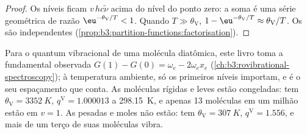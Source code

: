 \begin{proof}
Os níveis ficam $v\,hc\tilde\nu$ acima do nível do ponto zero: a soma é uma série geométrica
de razão $\eu^{-\theta_{\mathrm V}/T} < 1$. Quando $T \gg \theta_{\mathrm V}$, $1 - \eu^{-\theta_{\mathrm V}/T} \approx \theta_{\mathrm V}/T$.
Os  são independentes (\cref{prop:b3:partition-functions:factorisation}).
\end{proof}

Para o quantum vibracional de uma molécula diatômica, este livro toma a
fundamental observada $G(1) - G(0) = \omega_e - 2\omega_ex_e$
(\cref{ch:b3:rovibrational-spectroscopy}); à temperatura ambiente, só os primeiros
níveis importam, e é o seu espaçamento que conta. As moléculas rígidas e leves
estão congeladas:  tem $\theta_{\mathrm V} = \qty{3352}{K}$, $q^{\mathrm V} = 1.000013$ a \qty{298.15}{K}, e
apenas 13 moléculas em um milhão estão em $v = 1$. As pesadas e moles não estão: 
tem $\theta_{\mathrm V} = \qty{307}{K}$, $q^{\mathrm V} = 1.556$, e mais de um terço de suas moléculas
vibra.

